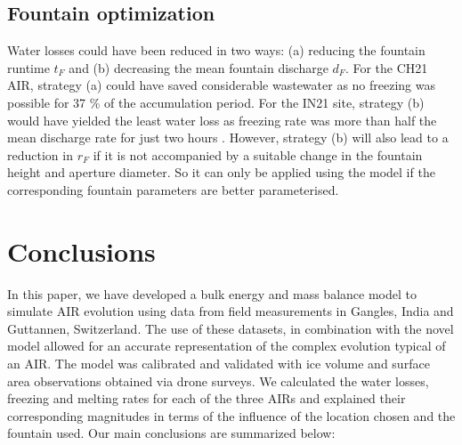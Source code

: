 \documentclass[utf8]{frontiersSCNS}
\begin{document}

\subsection{Fountain optimization}

Water losses could have been reduced in two ways: (a) reducing the fountain runtime $t_F$ and (b) decreasing the
mean fountain discharge $d_F$. For the CH21 AIR, strategy (a) could have saved considerable wastewater as no
freezing was possible for 37 \% of the accumulation period. For the IN21 site, strategy (b) would have yielded
the least water loss as freezing rate was more than half the mean discharge rate for just two hours . However,
strategy (b) will also lead to a reduction in $r_F$ if it is not accompanied by a suitable change in the
fountain height and aperture diameter. So it can only be applied using the model if the corresponding fountain
parameters are better parameterised.

\section{Conclusions}

In this paper, we have developed a bulk energy and mass balance model to simulate AIR evolution using data from
field measurements in Gangles, India and Guttannen, Switzerland. The use of these datasets, in combination with
the novel model allowed for an accurate representation of the complex evolution typical of an AIR. The model was
calibrated and validated with ice volume and surface area observations obtained via drone surveys. We calculated
the water losses, freezing and melting rates for each of the three AIRs and explained their corresponding
magnitudes in terms of the influence of the location chosen and the fountain used. Our main conclusions are
summarized below:
\end{document}
